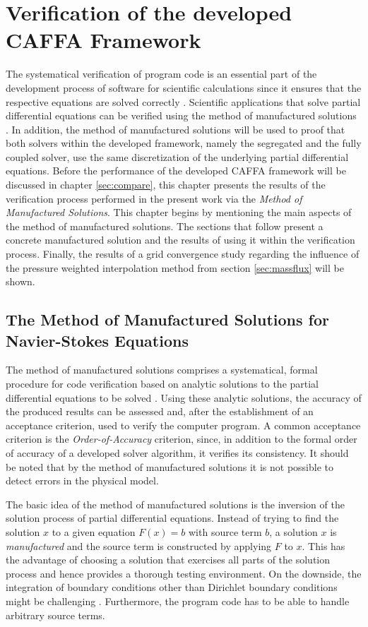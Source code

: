 \chapter{Verification of the developed CAFFA Framework}
\label{sec:verification}

The systematical verification of program code is an essential part of the development process of software for scientific calculations since it ensures that the respective equations are solved correctly \cite{oberkampf02}. Scientific applications that solve partial differential equations can be verified using the method of manufactured solutions \cite{salari00}. In addition, the method of manufactured solutions will be used to proof that both solvers within the developed framework, namely the segregated and the fully coupled solver, use the same discretization of the underlying partial differential equations. Before the performance of the developed CAFFA framework will be discussed in chapter \ref{sec:compare}, this chapter presents the results of the verification process performed in the present work via the \emph{Method of Manufactured Solutions}. This chapter begins by mentioning the main aspects of the method of manufactured solutions. The sections that follow present a concrete manufactured solution and the results of using it within the verification process. Finally, the results of a grid convergence study regarding the influence of the pressure weighted interpolation method from section \ref{sec:massflux} will be shown.

\section{The Method of Manufactured Solutions for Navier-Stokes Equations}

The method of manufactured solutions comprises a systematical, formal procedure for code verification based on analytic solutions to the partial differential equations to be solved \cite{salari00}. Using these analytic solutions, the accuracy of the produced results can be assessed and, after the establishment of an acceptance criterion, used to verify the computer program. A common acceptance criterion is the \emph{Order-of-Accuracy} criterion, since, in addition to the formal order of accuracy of a developed solver algorithm, it verifies its consistency. It should be noted that by the method of manufactured solutions it is not possible to detect errors in the physical model.

The basic idea of the method of manufactured solutions is the inversion of the solution process of partial differential equations. Instead of trying to find the solution \(x\) to a given equation \(F(x) = b\) with source term \(b\), a solution \(x\) is \emph{manufactured} and the source term is constructed by applying \(F\) to \(x\). This has the advantage of choosing a solution that exercises all parts of the solution process and hence provides a thorough testing environment. On the downside, the integration of boundary conditions other than Dirichlet boundary conditions might be challenging \cite{salari00}. Furthermore, the program code has to be able to handle arbitrary source terms. 

